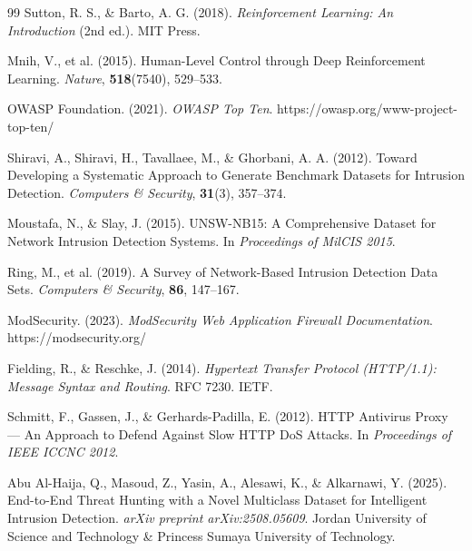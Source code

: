 \documentclass[12pt,a4paper,twoside]{report}
\begin{document}
\begin{thebibliography}{99}
 Sutton, R. S., \& Barto, A. G. (2018). \textit{Reinforcement Learning: An Introduction} (2nd ed.). MIT Press.

 Mnih, V., et al. (2015). Human-Level Control through Deep Reinforcement Learning. \textit{Nature}, \textbf{518}(7540), 529--533.

 OWASP Foundation. (2021). \textit{OWASP Top Ten}. https://owasp.org/www-project-top-ten/

 Shiravi, A., Shiravi, H., Tavallaee, M., \& Ghorbani, A. A. (2012). Toward Developing a Systematic Approach to Generate Benchmark Datasets for Intrusion Detection. \textit{Computers \& Security}, \textbf{31}(3), 357--374.

 Moustafa, N., \& Slay, J. (2015). UNSW-NB15: A Comprehensive Dataset for Network Intrusion Detection Systems. In \textit{Proceedings of MilCIS 2015}.

 Ring, M., et al. (2019). A Survey of Network-Based Intrusion Detection Data Sets. \textit{Computers \& Security}, \textbf{86}, 147--167.

 ModSecurity. (2023). \textit{ModSecurity Web Application Firewall Documentation}. https://modsecurity.org/

 Fielding, R., \& Reschke, J. (2014). \textit{Hypertext Transfer Protocol (HTTP/1.1): Message Syntax and Routing}. RFC 7230. IETF.

 Schmitt, F., Gassen, J., \& Gerhards-Padilla, E. (2012). HTTP Antivirus Proxy --- An Approach to Defend Against Slow HTTP DoS Attacks. In \textit{Proceedings of IEEE ICCNC 2012}.

 Abu Al-Haija, Q., Masoud, Z., Yasin, A., Alesawi, K., \& Alkarnawi, Y. (2025). End-to-End Threat Hunting with a Novel Multiclass Dataset for Intelligent Intrusion Detection. \textit{arXiv preprint arXiv:2508.05609}. Jordan University of Science and Technology \& Princess Sumaya University of Technology.

\end{thebibliography}
\end{document}
